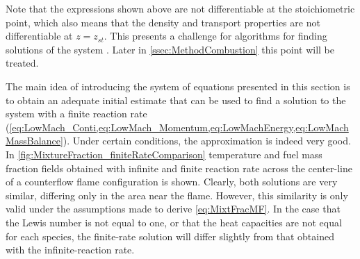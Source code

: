 Note that the expressions shown above are not differentiable at the stoichiometric point, which also means that the density and transport properties are not differentiable at $z =z_{st}$. This presents a challenge for algorithms for finding solutions of the system \parencite{rauwoensConservativeDiscreteCompatibilityconstraint2009}. Later in \cref{ssec:MethodCombustion} this point will be treated.

The main idea of introducing the system of equations presented in this section is to obtain an adequate initial estimate that can be used to find a solution to the system with a finite reaction rate (\cref{eq:LowMach_Conti,eq:LowMach_Momentum,eq:LowMachEnergy,eq:LowMachMassBalance}). Under certain conditions, the approximation is indeed very good. In \cref{fig:MixtureFraction_finiteRateComparison} temperature and fuel mass fraction fields obtained with infinite and finite reaction rate across the center-line of a counterflow flame configuration is shown. Clearly, both solutions are very similar, differing only in the area near the flame. However, this similarity is only valid under the assumptions made to derive \cref{eq:MixtFracMF}. In the case that the Lewis number is not equal to one, or that the heat capacities are not equal for each species, the finite-rate solution will differ slightly from that obtained with the infinite-reaction rate.

